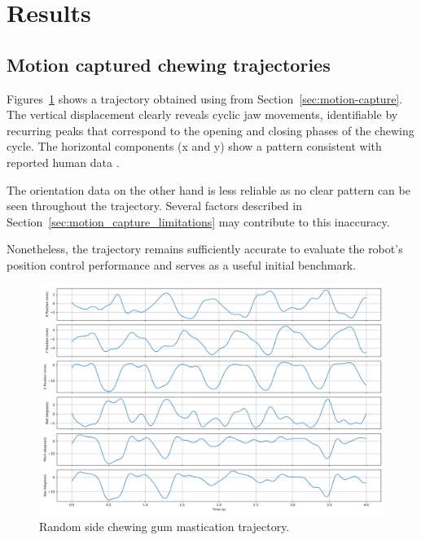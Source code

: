 \section{Results}
\subsection{Motion captured chewing trajectories}
\label{sec:traj_result}

Figures~\ref{fig:trajectory_plot} shows a trajectory obtained using from Section~\ref{sec:motion-capture}. The vertical displacement clearly reveals cyclic jaw movements, 
identifiable by recurring peaks that correspond to the opening and closing 
phases of the chewing cycle. The horizontal components (x and y) show a pattern consistent with reported human data \cite{chewing_traj}.

The orientation data on the other hand is less reliable as no clear pattern can be seen throughout the trajectory. Several factors described in Section~\ref{sec:motion_capture_limitations} 
may contribute to this inaccuracy. 

Nonetheless, the trajectory remains sufficiently accurate to evaluate the robot's position control performance and serves as a useful initial 
benchmark.


\begin{figure}[H]
    \centering
    \includegraphics[width=\textwidth]{figures/trajectory_plot.png}
    \caption{Random side chewing gum mastication trajectory.}
    \label{fig:trajectory_plot}
\end{figure}

